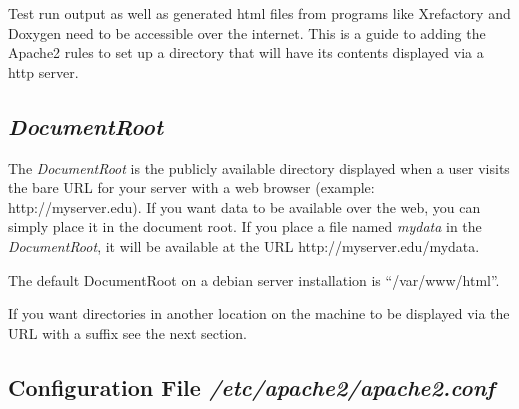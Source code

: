 \documentclass[12pt]{article}
\begin{document}
Test run output as well as generated html files from programs like Xrefactory and Doxygen need to be accessible over the internet. This is a guide to adding the Apache2 rules to set up a directory that will have its contents displayed via a http server.

\subsection*{\it DocumentRoot}

The {\it DocumentRoot} is the publicly available directory displayed when a user visits the bare URL for your server with a web browser (example: http://myserver.edu). If you want data to be available over the web, you can simply place it in the document root. If you place a file named {\it mydata} in the {\it DocumentRoot}, it will be available at the URL http://myserver.edu/mydata.

The default DocumentRoot on a debian server installation is ``/var/www/html''. 

If you want directories in another location on the machine to be displayed via the URL with a suffix see the next section.

\subsection*{Configuration File {\it /etc/apache2/apache2.conf}}
\end{document}
